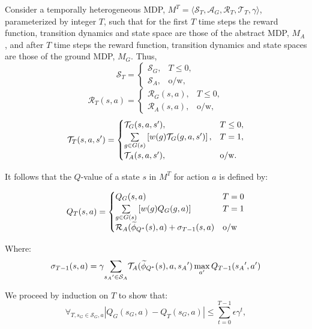 Consider a temporally heterogeneous \ac{MDP}, $M^T = \langle \mathcal{S}_T, \mathcal{A}_G, \mathcal{R}_T, \mathcal{T}_T, \gamma \rangle$, parameterized by integer $T$, such that for the first $T$ time steps the reward function, transition dynamics and state space are those of the abstract MDP, $M_A$, and after $T$ time steps the reward function, transition dynamics and state spaces are those of the ground MDP, $M_G$. Thus,
\begin{equation}
\mathcal{S}_T = \begin{cases}
\mathcal{S}_G,& T \leq 0, \\
\mathcal{S}_A,& \text{o/w},
\end{cases}
\end{equation}
\begin{equation}
\mathcal{R}_T(s,a) = \begin{cases}
\mathcal{R}_G(s,a),& T \leq 0, \\
\mathcal{R}_A(s, a),& \text{o/w},
\end{cases}
\end{equation}
\begin{equation}
\mathcal{T}_T(s,a,s') = \begin{cases}
\mathcal{T}_G(s,a,s'),& T \leq 0, \\
\underset{{g \in G(s)}}{\sum}\left[w(g)\mathcal{T}_G(g, a, s')\right],& T = 1, \\
\mathcal{T}_A(s,a,s'),& \text{o/w}.
\end{cases}
\end{equation}

It follows that the $Q$-value of a state $s$ in $M^T$ for action $a$ is defined by:

\begin{equation}
Q_T(s, a) = 
\begin{cases}
	   Q_G(s, a) &  T=0\\
	   \underset{g \in G(s)}{\sum} \left[ w(g)Q_G(g,a) \right] & T = 1\\
	   \mathcal{R}_A(\widetilde \phi_{Q^*}(s),a) + \sigma_{T-1}(s,a) &\text{o/w}

\end{cases}
\end{equation}

Where:
\begin{equation}
\sigma_{T-1}(s,a) = \gamma \underset{{s_A}' \in \mathcal{S}_A}{\sum} \mathcal{T}_A(\widetilde \phi_{Q^*}(s),a,{s_A}') \max_{a'} Q_{T-1}({s_A}', a')
\end{equation}

We proceed by induction on $T$ to show that:
\begin{equation}
\forall_{T, s_G \in \mathcal{S}_G, a} |Q_G(s_G, a) - Q_T(s_G, a)| \leq \sum_{t=0}^{T-1} \epsilon \gamma^{t},
\end{equation}

